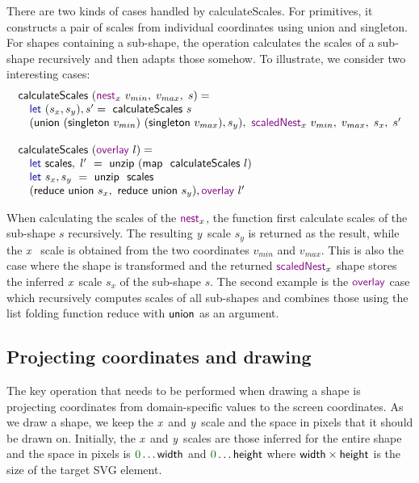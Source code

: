 \documentclass{jfp}
\newcommand{\X}{\emph{x}\ }
\newcommand{\Y}{\emph{y}\ }
\newcommand{\num}[1]{\textcolor{numclr}{#1}}
\newcommand{\ident}[1]{\textnormal{\textcolor{idclr}{\sffamily #1}}}
\newcommand{\kvd}[1]{\textnormal{\textcolor{kvdclr}{\sffamily #1}}}
\newcommand{\fkvd}[1]{\textnormal{\textcolor{fkvdclr}{\sffamily #1}}}
\begin{document}
\vspace{-1em}
\noindent
There are two kinds of cases handled by \ident{calculateScales}. For primitives, it constructs
a pair of scales from individual coordinates using \ident{union} and \ident{singleton}. For
shapes containing a sub-shape, the operation calculates the scales of a sub-shape recursively
and then adapts those somehow. To illustrate, we consider two interesting cases:
%
\begin{equation*}
\begin{array}{l}
\ident{calculateScales}~(\kvd{nest}_x~v_{min},\;v_{max},\;s) = \\
\quad\fkvd{let}~(s_x, s_y),s' = \ident{calculateScales}~s\\
\quad(\ident{union}~(\ident{singleton}~v_{min})~(\ident{singleton}~v_{max}), s_y),~\kvd{scaledNest}_x~v_{min},\;v_{max},\;s_x,\;s'\\
\\
\ident{calculateScales}~(\kvd{overlay}~l) = \\
\quad\fkvd{let}~\ident{scales},\;l'~=~\ident{unzip}~(\ident{map}~\ident{calculateScales}~l)\\
\quad\fkvd{let}~s_x,s_y~=~\ident{unzip}~\ident{scales}\\
\quad(\ident{reduce}~\ident{union}~s_x,~\ident{reduce}~\ident{union}~s_y), \kvd{overlay}~l'
\end{array}
\end{equation*}

\vspace{-0.5em}
\noindent
When calculating the scales of the $\kvd{nest}_x$, the function first calculate scales of the
sub-shape $s$ recursively. The resulting \Y scale $s_y$ is returned as the result, while the \X
scale is obtained from the two coordinates $v_{min}$ and $v_{max}$. This is also the case where
the shape is transformed and the returned $\kvd{scaledNest}_x$ shape stores the inferred \X scale
$s_x$ of the sub-shape $s$. The second example is the $\kvd{overlay}$ case which recursively
computes scales of all sub-shapes and combines those using the list folding function
\ident{reduce} with $\ident{union}$ as an argument.

\subsection{Projecting coordinates and drawing}
The key operation that needs to be performed when drawing a shape is projecting coordinates from
domain-specific values to the screen coordinates. As we draw a shape, we keep the \X and \Y scale
and the space in pixels that it should be drawn on. Initially, the \X and \Y scales are those
inferred for the entire shape and the space in pixels is $\num{0}\ldots\ident{width}$ and
$\num{0}\ldots\ident{height}$ where $\ident{width}\times\ident{height}$ is the size of the target
SVG element.
\end{document}

